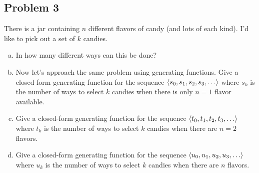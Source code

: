 \documentclass[12pt]{article}
\begin{document}
\subsection*{Problem 3}

There is a jar containing $n$ different flavors of candy (and lots of each kind).  I'd like to
pick out a set of $k$ candies.

\begin{enumerate}[(a)]

\item In how many different ways can this be done?


\item Now let's approach the same problem using generating functions.
Give a closed-form generating function for the sequence $\left\langle s_0,
s_1, s_2, s_3, \ldots\right\rangle$ where $s_k$ is the number of ways to select
$k$ candies when there is only $n = 1$ flavor available.

\solution[\vspace{1.25in}]{
\[
1 + x + x^2 + x^3 + \ldots = \frac{1}{1-x}
\]
}

\item Give a closed-form generating function for the sequence
$\left\langle t_0, t_1, t_2, t_3, \ldots\right\rangle$ where $t_k$ is the number of ways
to select $k$ candies when there are $n = 2$ flavors.

\solution[\vspace{1.25in}]{
\[
(1 + x + x^2 + x^3 + \ldots)^2 = \frac{1}{(1-x)^2}
\]
}

\item Give a closed-form generating function for the sequence
$\left\langle u_0, u_1, u_2, u_3, \ldots\right\rangle$ where $u_k$ is the number of ways
to select $k$ candies when there are $n$ flavors.

\solution[\vspace{1.25in}]{
\[
\frac{1}{(1-x)^n}
\]
}

\end{enumerate}
\end{document}
